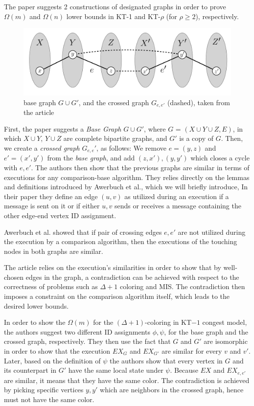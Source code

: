 \documentclass[11pt]{article}
\begin{document}
The paper suggests 2 constructions of designated graphs in order to prove $\Omega(m)$ and $\Omega(n)$ lower bounds in KT-1 and KT-$\rho$ (for $\rho \ge 2$), respectively. 
\begin{figure}[h]
    \centering
    \includegraphics[scale=0.7]{graph_cross_graph}
    \caption{base graph $G \cup G'$, and the crossed graph $G_{e,e'}$ (dashed), taken from the article \cite{origin}}
    \label{fig:graph_cross_graph}
\end{figure}
First, the paper suggests a \textit{Base Graph} $G \cup G'$, where $G$ = $( X \cup Y \cup Z, E)$, in which $X \cup Y$, $Y \cup Z$ are complete bipartite graphs, and $G'$ is a copy of $G$. 
Then, we create a \textit{crossed graph} $G_{e,e}'$, as follows: 
We remove $e=(y,z)$ and $e'=(x',y')$ from the \textit{base graph}, and add $(z,x'), (y,y')$ which closes a cycle with $e,e'$. The authors then show that the previous graphs are similar in terms of executions for any comparison-base algorithm. They relies directly on the lemmas and definitions introduced by Awerbuch et al.\cite{Awerbuch}, which we will briefly introduce, In their paper they define an edge $(u,v)$ as utilized during an execution if a message is sent on it or if either $u, v$ sends or receives a message containing the other edge-end vertex ID assignment.

Awerbuch et al. showed that if pair of crossing edges $e, e'$ are not utilized during the execution by a comparison algorithm, then the executions of the touching nodes in both graphs are similar.

The article relies on the execution's similarities in order to show that by well-chosen edges in the graph, a contradiction can be achieved with respect to the correctness of problems such as $\Delta +1$ coloring and MIS. The contradiction then imposes a constraint on the comparison algorithm itself, which leads to the desired lower bounds.

In order to show the $\Omega(m)$ for the $(\Delta +1)$-coloring in KT$-1$ congest model, the authors suggest two different ID assignments $\phi, \psi$, for the base graph and the crossed graph, respectively. They then use the fact that $G$ and $G'$ are isomorphic in order to show that the execution $EX_G$ and $EX_{G'}$ are similar for every $v$ and $v'$. Later, based on the definition of $\psi$ the authors show that every vertex in $G$ and its counterpart in $G'$ have the same local state under $\psi$. Because $EX$ and $EX_{e,e'}$ are similar, it means that they have the same color. The contradiction is achieved by picking specific vertices $y,y'$ which are neighbors in the crossed graph, hence must not have the same color.
\end{document}
